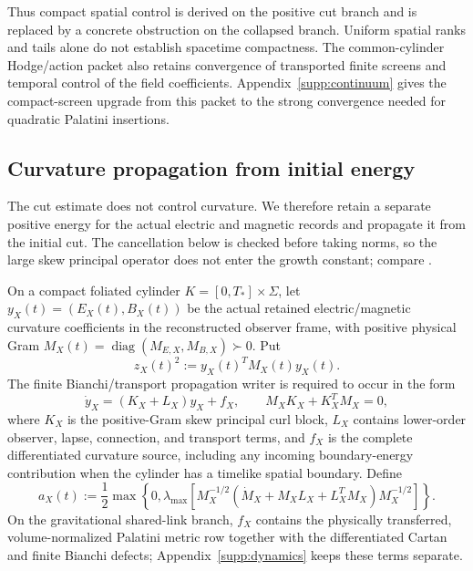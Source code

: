 \documentclass[11pt]{article}
\numberwithin{equation}{section}
\theoremstyle{definition}
\theoremstyle{remark}
\begin{document}
Thus compact spatial control is derived on the positive cut branch and is
replaced by a concrete obstruction on the collapsed branch.  Uniform spatial
ranks and tails alone do not establish spacetime compactness.  The
common-cylinder Hodge/action packet also retains convergence of transported
finite screens and temporal control of the field coefficients.
Appendix~\ref{supp:continuum} gives the compact-screen upgrade from this
packet to the strong convergence needed for quadratic Palatini insertions.

\subsection{Curvature propagation from initial energy}

The cut estimate does not control curvature. We therefore retain a separate
positive energy for the actual electric and magnetic records and propagate
it from the initial cut. The cancellation below is checked before taking
norms, so the large skew principal operator does not enter the growth
constant; compare \cite{ACY1998,KRS2015}.

On a compact foliated cylinder $K=[0,T_*]\times\Sigma$, let
$y_X(t)=(E_X(t),B_X(t))$ be the actual retained electric/magnetic curvature
coefficients in the reconstructed observer frame, with positive physical Gram
$M_X(t)=\operatorname{diag}(M_{E,X},M_{B,X})\succ0$.  Put
\begin{equation}
 z_X(t)^2:=y_X(t)^TM_X(t)y_X(t).
 \label{eq:main-curvature-energy}
\end{equation}
The finite Bianchi/transport propagation writer is required to occur in the
form
\begin{equation}
 \dot y_X=(K_X+L_X)y_X+f_X,
 \qquad M_XK_X+K_X^TM_X=0,
 \label{eq:main-curvature-propagation-writer}
\end{equation}
where $K_X$ is the positive-Gram skew principal curl block, $L_X$ contains
lower-order observer, lapse, connection, and transport terms, and $f_X$ is the
complete differentiated curvature source, including any incoming boundary-energy
contribution when the cylinder has a timelike spatial boundary.  Define
\begin{equation}
 a_X(t):=\frac12\max\left\{0,
 \lambda_{\max}\!\left[
 M_X^{-1/2}(\dot M_X+M_XL_X+L_X^TM_X)M_X^{-1/2}
 \right]\right\}.
 \label{eq:main-curvature-growth}
\end{equation}
On the gravitational shared-link branch, $f_X$ contains the physically
transferred, volume-normalized Palatini metric row together with the
differentiated Cartan and finite Bianchi defects; Appendix~\ref{supp:dynamics}
keeps these terms separate.
\end{document}
